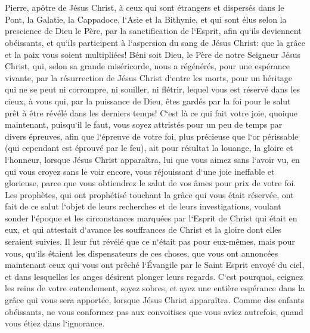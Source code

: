 

\chapter{}

\verse Pierre, apôtre de Jésus Christ, à ceux qui sont étrangers et dispersés dans le Pont, la Galatie, la Cappadoce, l`Asie et la Bithynie, 
\verse et qui sont élus selon la prescience de Dieu le Père, par la sanctification de l`Esprit, afin qu`ils deviennent obéissants, et qu`ils participent à l`aspersion du sang de Jésus Christ: que la grâce et la paix vous soient multipliées! 
\verse Béni soit Dieu, le Père de notre Seigneur Jésus Christ, qui, selon sa grande miséricorde, nous a régénérés, pour une espérance vivante, par la résurrection de Jésus Christ d`entre les morts, 
\verse pour un héritage qui ne se peut ni corrompre, ni souiller, ni flétrir, lequel vous est réservé dans les cieux, 
\verse à vous qui, par la puissance de Dieu, êtes gardés par la foi pour le salut prêt à être révélé dans les derniers temps! 
\verse C`est là ce qui fait votre joie, quoique maintenant, puisqu`il le faut, vous soyez attristés pour un peu de temps par divers épreuves, 
\verse afin que l`épreuve de votre foi, plus précieuse que l`or périssable (qui cependant est éprouvé par le feu), ait pour résultat la louange, la gloire et l`honneur, lorsque Jésus Christ apparaîtra, 
\verse lui que vous aimez sans l`avoir vu, en qui vous croyez sans le voir encore, vous réjouissant d`une joie ineffable et glorieuse, 
\verse parce que vous obtiendrez le salut de vos âmes pour prix de votre foi. 
\verse Les prophètes, qui ont prophétisé touchant la grâce qui vous était réservée, ont fait de ce salut l`objet de leurs recherches et de leurs investigations, 
\verse voulant sonder l`époque et les circonstances marquées par l`Esprit de Christ qui était en eux, et qui attestait d`avance les souffrances de Christ et la gloire dont elles seraient suivies. 
\verse Il leur fut révélé que ce n`était pas pour eux-mêmes, mais pour vous, qu`ils étaient les dispensateurs de ces choses, que vous ont annoncées maintenant ceux qui vous ont prêché l`Évangile par le Saint Esprit envoyé du ciel, et dans lesquelles les anges désirent plonger leurs regards. 
\verse C`est pourquoi, ceignez les reins de votre entendement, soyez sobres, et ayez une entière espérance dans la grâce qui vous sera apportée, lorsque Jésus Christ apparaîtra. 
\verse Comme des enfants obéissants, ne vous conformez pas aux convoitises que vous aviez autrefois, quand vous étiez dans l`ignorance. 
